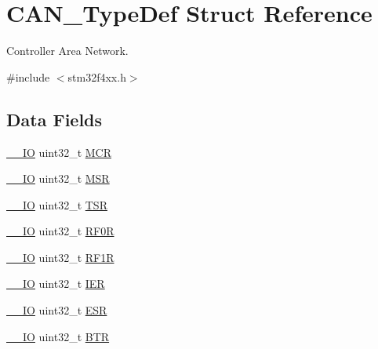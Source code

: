 \hypertarget{struct_c_a_n___type_def}{\section{C\-A\-N\-\_\-\-Type\-Def Struct Reference}
\label{struct_c_a_n___type_def}
}


Controller Area Network.  




{\ttfamily \#include $<$stm32f4xx.\-h$>$}

\subsection*{Data Fields}
\begin{DoxyCompactItemize}
\item 
\hyperlink{group___c_m_s_i_s__core__definitions_gaec43007d9998a0a0e01faede4133d6be}{\-\_\-\-\_\-\-I\-O} uint32\-\_\-t \hyperlink{struct_c_a_n___type_def_a27af4e9f888f0b7b1e8da7e002d98798}{M\-C\-R}
\item 
\hyperlink{group___c_m_s_i_s__core__definitions_gaec43007d9998a0a0e01faede4133d6be}{\-\_\-\-\_\-\-I\-O} uint32\-\_\-t \hyperlink{struct_c_a_n___type_def_acdd4c1b5466be103fb2bb2a225b1d3a9}{M\-S\-R}
\item 
\hyperlink{group___c_m_s_i_s__core__definitions_gaec43007d9998a0a0e01faede4133d6be}{\-\_\-\-\_\-\-I\-O} uint32\-\_\-t \hyperlink{struct_c_a_n___type_def_a87e3001757a0cd493785f1f3337dd0e8}{T\-S\-R}
\item 
\hyperlink{group___c_m_s_i_s__core__definitions_gaec43007d9998a0a0e01faede4133d6be}{\-\_\-\-\_\-\-I\-O} uint32\-\_\-t \hyperlink{struct_c_a_n___type_def_accf4141cee239380d0ad4634ee21dbf6}{R\-F0\-R}
\item 
\hyperlink{group___c_m_s_i_s__core__definitions_gaec43007d9998a0a0e01faede4133d6be}{\-\_\-\-\_\-\-I\-O} uint32\-\_\-t \hyperlink{struct_c_a_n___type_def_a02b589bb589df4f39e549dca4d5abb08}{R\-F1\-R}
\item 
\hyperlink{group___c_m_s_i_s__core__definitions_gaec43007d9998a0a0e01faede4133d6be}{\-\_\-\-\_\-\-I\-O} uint32\-\_\-t \hyperlink{struct_c_a_n___type_def_a6566f8cfbd1d8aa7e8db046aa35e77db}{I\-E\-R}
\item 
\hyperlink{group___c_m_s_i_s__core__definitions_gaec43007d9998a0a0e01faede4133d6be}{\-\_\-\-\_\-\-I\-O} uint32\-\_\-t \hyperlink{struct_c_a_n___type_def_a2b39f943954e0e7d177b511d9074a0b7}{E\-S\-R}
\item 
\hyperlink{group___c_m_s_i_s__core__definitions_gaec43007d9998a0a0e01faede4133d6be}{\-\_\-\-\_\-\-I\-O} uint32\-\_\-t \hyperlink{struct_c_a_n___type_def_a5c0fcd3e7b4c59ab1dd68f6bd8f74e07}{B\-T\-R}

\end{DoxyCompactItemize}
